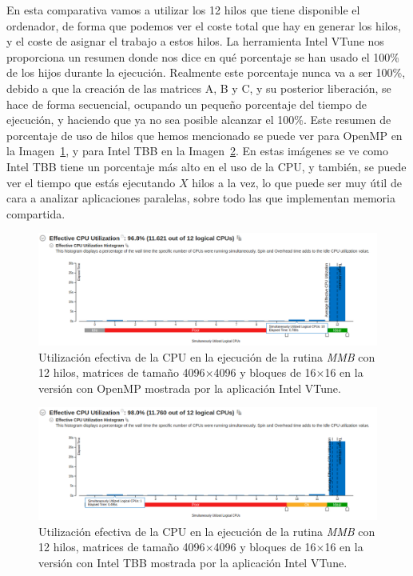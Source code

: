 \documentclass[a4paper,12pt]{article}
\begin{document}
En esta comparativa vamos a utilizar los 12 hilos que tiene disponible el ordenador, de forma que podemos ver el coste total que hay en generar los hilos, y el coste de asignar el trabajo a estos hilos. La herramienta Intel VTune nos proporciona un resumen donde nos dice en qué porcentaje se han usado el 100\% de los hijos durante la ejecución. Realmente este porcentaje nunca va a ser 100\%, debido a que la creación de las matrices A, B y C, y su posterior liberación, se hace de forma secuencial, ocupando un pequeño porcentaje del tiempo de ejecución, y haciendo que ya no sea posible alcanzar el 100\%. Este resumen de porcentaje de uso de hilos que hemos mencionado se puede ver para OpenMP en la Imagen~\ref{fig:vtune-resumeomp}, y para Intel TBB en la Imagen~\ref{fig:vtune-resumetbb}. En estas imágenes se ve como Intel TBB tiene un porcentaje más alto en el uso de la CPU, y también, se puede ver el tiempo que estás ejecutando $X$ hilos a la vez, lo que puede ser muy útil de cara a analizar aplicaciones paralelas, sobre todo las que implementan memoria compartida.
\begin{figure}[htbp]
    \includegraphics[scale=0.35]{./images/vtuneOmpResume.png}
    \centering
    \caption{Utilización efectiva de la CPU en la ejecución de la rutina {\it MMB} con 12 hilos, matrices de tamaño 4096$\times$4096 y bloques de 16$\times$16 en la versión con OpenMP mostrada por la aplicación Intel VTune.}
    \label{fig:vtune-resumeomp}
\end{figure}

\begin{figure}[htbp]
    \includegraphics[scale=0.35]{./images/vtuneTbbResume.png}
    \centering
    \caption{Utilización efectiva de la CPU en la ejecución de la rutina {\it MMB} con 12 hilos, matrices de tamaño 4096$\times$4096 y bloques de 16$\times$16 en la versión con Intel TBB mostrada por la aplicación Intel VTune.}
    \label{fig:vtune-resumetbb}
\end{figure}
\end{document}
